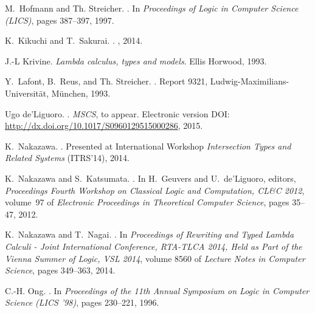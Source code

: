 \documentclass{lmcs}
\begin{document}
\begin{thebibliography}{10}
M.~Hofmann and Th. Streicher.
.
\newblock In \emph{Proceedings of Logic in Computer Science (LICS)}, pages
 387--397, 1997.

K.~Kikuchi and T.~Sakurai.
.
, 2014.

J.-L Krivine.
\newblock \emph{{Lambda calculus, types and models}}.
\newblock Ellis Horwood, 1993.

Y.~Lafont, B.~Reus, and Th. Streicher.
.
\newblock Report 9321, Ludwig-Maximilians-Universit\"at, M\"unchen, 1993.

Ugo de'Liguoro.
.
\newblock \emph{MSCS},
\newblock to appear. Electronic version DOI: \url{http://dx.doi.org/10.1017/S0960129515000286},
2015.

K.~Nakazawa.
.
\newblock Presented at International Workshop \emph{Intersection Types and
 Related Systems} (ITRS'14), 2014.

K.~Nakazawa and S.~Katsumata.
.
\newblock In H.~Geuvers and U.~de'Liguoro, editors, \emph{Proceedings Fourth
 Workshop on Classical Logic and Computation, CL{\&}C 2012}, volume~97 of {\em
 Electronic Proceedings in Theoretical Computer Science}, pages 35--47, 2012.

K.~Nakazawa and T.~Nagai.
.
\newblock In \emph{Proceedings of Rewriting and Typed Lambda Calculi - Joint
 International Conference, {RTA-TLCA} 2014, Held as Part of the Vienna Summer
 of Logic, {VSL} 2014}, volume 8560 of \emph{Lecture Notes in Computer
 Science}, pages 349--363, 2014.

C.-H. Ong.
.
\newblock In \emph{Proceedings of the 11th Annual Symposium on Logic in Computer
 Science (LICS '98)}, pages 230--221, 1996.


\end{thebibliography}
\end{document}
